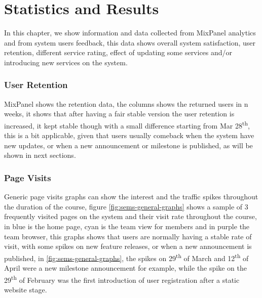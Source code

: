 \chapter{Statistics and Results}
\label{chap:statistics}

In this chapter, we show information and data collected from MixPanel\texttrademark{} analytics and from system users feedback, this data shows
overall system satisfaction, user retention, different service rating, effect of updating some services and/or introducing new services on the system.

\subsection{User Retention}
\label{sub:user-retention}

MixPanel\texttrademark{} shows the retention data, the columns shows the returned users in n weeks, it shows that after having a fair stable version
the user retention is increased, it kept stable though with a small difference starting from Mar 28\textsuperscript{th}, this is a bit applicable, given
that users usually comeback when the system have new updates, or when a new announcement or milestone is published, as will be shown in next sections.

\subsection{Page Visits}
\label{sub:page-visits}
Generic page visits graphs can show the interest and the traffic spikes throughout the duration of the course, figure \ref{fig:sems-general-graphs}
shows a sample of 3 frequently visited pages on the system and their visit rate throughout the course, in blue is the home page,
cyan is the team view for members and in purple the team browser, this graphs shows that users are normally having a stable rate of visit, with some
spikes on new feature releases, or when a new announcement is published, in \ref{fig:sems-general-graphs}, the spikes on 29\textsuperscript{th} of March and
12\textsuperscript{th} of April were a new milestone announcement for example, while the spike on the 29\textsuperscript{th} of February was the first
introduction of user registration after a static website stage.

